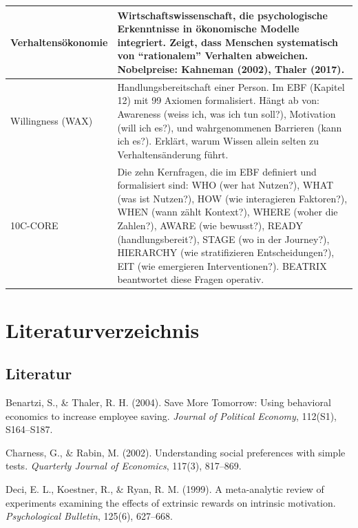 \documentclass[11pt,a4paper]{article}
\begin{document}
\begin{longtable}{@{}L{4cm}L{10cm}@{}}
\midrule
Verhaltensökonomie & Wirtschaftswissenschaft, die psychologische Erkenntnisse in ökonomische Modelle integriert. Zeigt, dass Menschen systematisch von ``rationalem'' Verhalten abweichen. Nobelpreise: Kahneman (2002), Thaler (2017). \\
\midrule
Willingness (WAX) & Handlungsbereitschaft einer Person. Im EBF (Kapitel 12) mit 99 Axiomen formalisiert. Hängt ab von: Awareness (weiss ich, was ich tun soll?), Motivation (will ich es?), und wahrgenommenen Barrieren (kann ich es?). Erklärt, warum Wissen allein selten zu Verhaltensänderung führt. \\
\midrule
10C-CORE & Die zehn Kernfragen, die im EBF definiert und formalisiert sind: WHO (wer hat Nutzen?), WHAT (was ist Nutzen?), HOW (wie interagieren Faktoren?), WHEN (wann zählt Kontext?), WHERE (woher die Zahlen?), AWARE (wie bewusst?), READY (handlungsbereit?), STAGE (wo in der Journey?), HIERARCHY (wie stratifizieren Entscheidungen?), EIT (wie emergieren Interventionen?). BEATRIX beantwortet diese Fragen operativ. \\
\bottomrule
\end{longtable}

\newpage


\section*{Literaturverzeichnis}

\subsection*{Literatur}

Benartzi, S., \& Thaler, R. H. (2004). Save More Tomorrow: Using behavioral economics to increase employee saving. \textit{Journal of Political Economy}, 112(S1), S164--S187.

\vspace{0.3cm}
Charness, G., \& Rabin, M. (2002). Understanding social preferences with simple tests. \textit{Quarterly Journal of Economics}, 117(3), 817--869.

\vspace{0.3cm}
Deci, E. L., Koestner, R., \& Ryan, R. M. (1999). A meta-analytic review of experiments examining the effects of extrinsic rewards on intrinsic motivation. \textit{Psychological Bulletin}, 125(6), 627--668.
\end{document}
